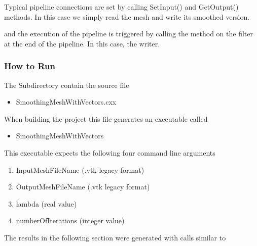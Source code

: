 \documentclass{InsightArticle}
\begin{document}
\begin{center}

\end{center}

Typical pipeline connections are set by calling SetInput() and GetOutput() methods.
In this case we simply read the mesh and write its smoothed version.

\begin{center}

\end{center}

and the execution of the pipeline is triggered by calling the  method 
on the filter at the end of the pipeline. In this case, the writer.

\begin{center}

\end{center}


\subsubsection{How to Run}

The Subdirectory  contain the source file 

\begin{itemize}
\item SmoothingMeshWithVectors.cxx
\end{itemize}

When building the project this file generates an executable called

\begin{itemize}
\item SmoothingMeshWithVectors
\end{itemize}

This executable expects the following four command line arguments

\begin{enumerate}
\item InputMeshFileName (.vtk legacy format)
\item OutputMeshFileName (.vtk legacy format)
\item lambda (real value)
\item numberOfIterations (integer value)
\end{enumerate}

The results in the following section were generated with calls similar to
\end{document}
